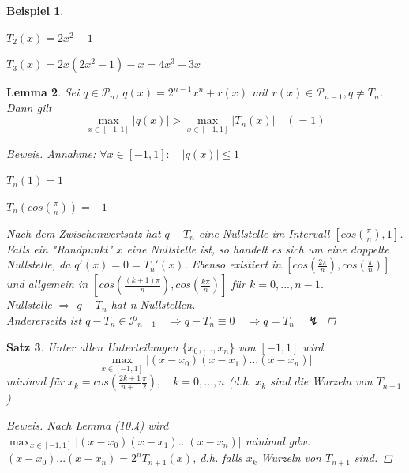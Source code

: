 \documentclass[12pt]{article}
\theoremstyle{break}
\newtheorem{theorem}{Satz}[subsection]
\newtheorem{lemma}[theorem]{Lemma}
\newtheorem{example}[theorem]{Beispiel}
\begin{document}
\begin{example} \leavevmode
\begin{description}
  \item $T_2(x) = 2x^2 - 1$
  \item $T_3(x) = 2x(2x^2 -1) - x = 4x^3 -3x$
\end{description}
\end{example}

\begin{lemma}
Sei $q \in \mathcal{P}_n$, $q(x) = 2^{n-1} x^n + r(x)$ mit $r(x) \in \mathcal{P}_{n-1}, q \neq T_n$. Dann gilt
\[ \max_{x\in [-1, 1]} \vert q(x) \vert > \max_{x\in [-1, 1]} \vert T_n(x) \vert \quad(=1)\]

\begin{proof}[Beweis]\leavevmode
Annahme: $\forall x \in [-1, 1]: \quad \vert q(x) \vert \leq 1$
\begin{description}
  \item $T_n(1) = 1$
  \item $T_n(cos(\frac{\pi}{n})) = -1$
\end{description}
Nach dem Zwischenwertsatz hat $q-T_n$ eine Nullstelle im Intervall $[cos(\frac{\pi}{n}), 1]$. Falls ein "Randpunkt" $x$ eine Nullstelle ist, so handelt es sich um eine doppelte Nullstelle, da $q'(x) = 0 = T_n'(x)$. Ebenso existiert in $[cos(\frac{2\pi}{n}), cos(\frac{\pi}{n})]$ und allgemein in $[cos(\frac{(k+1)\pi}{n}), cos(\frac{k\pi}{n})]$ für $k=0,...,n-1$.\\
Nullstelle $\Rightarrow$ $q-T_n$ hat n Nullstellen.\\
Andererseits ist $q-T_n \in \mathcal{P}_{n-1} \quad \Rightarrow q-T_n \equiv 0 \quad \Rightarrow q = T_n \quad \lightning$
\end{proof}
\end{lemma}

\begin{theorem}
Unter allen Unterteilungen $\{x_0,...,x_n\}$ von $[-1,1]$ wird 
$$ \max_{x \in [-1, 1]} \vert (x-x_0)(x-x_1)...(x-x_n) \vert $$
minimal für $x_k = cos\left( \frac{2k+1}{n+1} \frac{\pi}{2}\right), \quad k=0,...,n$ (d.h. $x_k$ sind die Wurzeln von $T_{n+1}$)

\begin{proof}[Beweis]
Nach Lemma (10.4) wird $\max_{x \in [-1, 1]} \vert (x-x_0)(x-x_1)...(x-x_n) \vert$ minimal gdw.  $(x-x_0)...(x-x_n) = 2^{n} T_{n+1}(x)$, d.h. falls $x_k$ Wurzeln von $T_{n+1}$ sind.
\end{proof}
\end{theorem}
\end{document}
